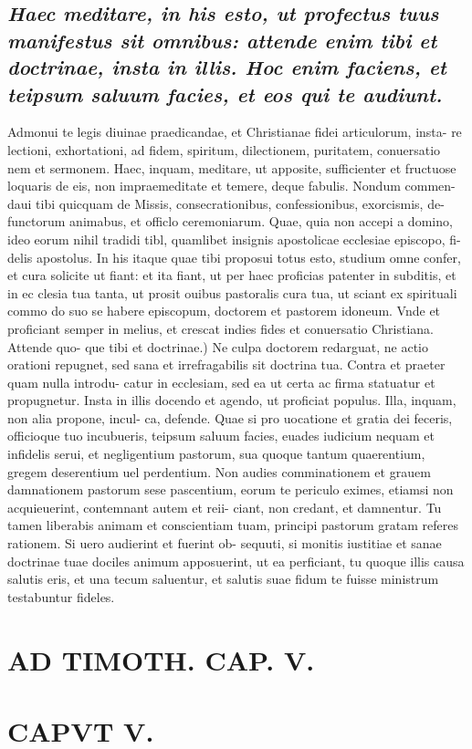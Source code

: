 \documentclass{article}
\begin{document}
\begin{pages}
\subsection*{\textit{Haec meditare, in his esto, ut profectus tuus manifestus sit omnibus: attende enim tibi et doctrinae, insta in illis. Hoc enim faciens, et teipsum saluum facies, et eos qui te audiunt. }}\pstart Admonui te legis diuinae praedicandae, et Christianae fidei articulorum, insta- re lectioni, exhortationi, ad fidem, spiritum, dilectionem, puritatem, conuersatio nem et sermonem. Haec, inquam, meditare, ut apposite, sufficienter et fructuose loquaris de eis, non impraemeditate et temere, deque fabulis. Nondum commen- daui tibi quicquam de Missis, consecrationibus, confessionibus, exorcismis, de- functorum animabus, et officlo ceremoniarum. Quae, quia non accepi a domino, ideo eorum nihil tradidi tibl, quamlibet insignis apostolicae ecclesiae episcopo, fi- delis apostolus. In his itaque quae tibi proposui totus esto, studium omne confer, et cura solicite ut fiant: et ita fiant, ut per haec proficias patenter in subditis, et in ec clesia tua tanta, ut prosit ouibus pastoralis cura tua, ut sciant ex spirituali commo do suo se habere episcopum, doctorem et pastorem idoneum. Vnde et proficiant semper in melius, et crescat indies fides et conuersatio Christiana. Attende quo- que tibi et doctrinae.) Ne culpa doctorem redarguat, ne actio orationi repugnet, sed sana et irrefragabilis sit doctrina tua. Contra et praeter quam nulla introdu- catur in ecclesiam, sed ea ut certa ac firma statuatur et propugnetur. Insta in illis docendo et agendo, ut proficiat populus. Illa, inquam, non alia propone, incul- ca, defende. Quae si pro uocatione et gratia dei feceris, officioque tuo incubueris, teipsum saluum facies, euades iudicium nequam et infidelis serui, et negligentium pastorum, sua quoque tantum quaerentium, gregem deserentium uel perdentium. Non audies comminationem et grauem damnationem pastorum sese pascentium, eorum te periculo eximes, etiamsi non acquieuerint, contemnant autem et reii- ciant, non credant, et damnentur. Tu tamen liberabis animam et conscientiam tuam, principi pastorum gratam referes rationem. Si uero audierint et fuerint ob- sequuti, si monitis iustitiae et sanae doctrinae tuae dociles animum apposuerint, ut ea perficiant, tu quoque illis causa salutis eris, et una tecum saluentur, et salutis suae fidum te fuisse ministrum testabuntur fideles.  \pend
\section*{AD TIMOTH. CAP. V. }
\marginpar{[ p.513 ]}
\endnumbering\beginnumbering\section{CAPVT V.}
{}

\end{pages}
\end{document}
